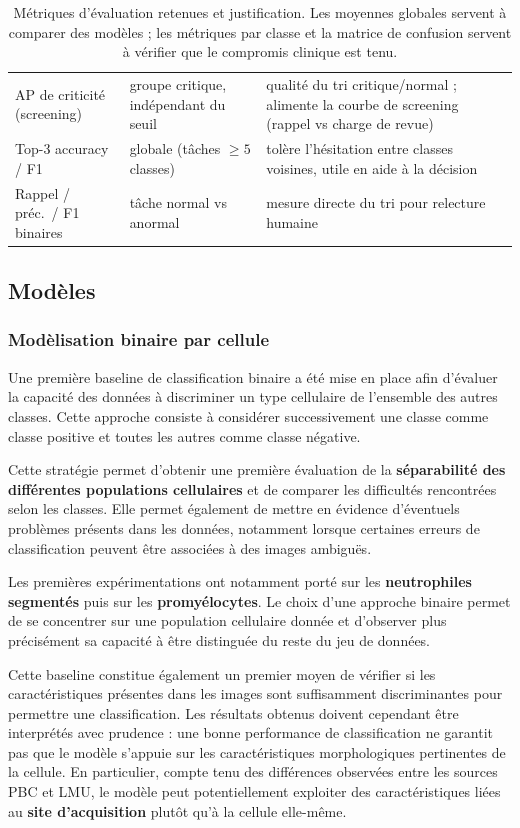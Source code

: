 \begin{table}[H]
\begin{tabular}{@{}>{\raggedright\arraybackslash}p{3.1cm} >{\raggedright\arraybackslash}p{4.0cm} >{\raggedright\arraybackslash}p{6.2cm}@{}}
    AP de criticité (screening) & groupe critique, indépendant du seuil & qualité du tri critique/normal ; alimente la courbe de screening (rappel vs charge de revue) \\
    Top-3 accuracy / F1 & globale (tâches $\geq 5$ classes) & tolère l'hésitation entre classes voisines, utile en aide à la décision \\
    Rappel / préc.\ / F1 binaires & tâche normal vs anormal    & mesure directe du tri pour relecture humaine \\
    \bottomrule
  \end{tabular}
  \caption{Métriques d'évaluation retenues et justification.
  Les moyennes globales servent à comparer des modèles ; les métriques par classe et la matrice de confusion servent à vérifier que le compromis clinique est tenu.}
  \label{tab:metriques}
\end{table}

\subsection{Modèles}
\subsubsection{Modèlisation binaire par cellule}
\label{sec:modele-binaire}
Une première baseline de classification binaire a été mise en place afin d’évaluer la capacité des données à discriminer un type cellulaire de l’ensemble des autres classes.
Cette approche consiste à considérer successivement une classe comme classe positive et toutes les autres comme classe négative.

Cette stratégie permet d’obtenir une première évaluation de la \textbf{séparabilité des différentes populations cellulaires} et de comparer les difficultés rencontrées selon les classes.
Elle permet également de mettre en évidence d’éventuels problèmes présents dans les données, notamment lorsque certaines erreurs de classification peuvent être associées à des images ambiguës.

Les premières expérimentations ont notamment porté sur les \textbf{neutrophiles segmentés} puis sur les \textbf{promyélocytes}.
Le choix d’une approche binaire permet de se concentrer sur une population cellulaire donnée et d’observer plus précisément sa capacité à être distinguée du reste du jeu de données.

Cette baseline constitue également un premier moyen de vérifier si les caractéristiques présentes dans les images sont suffisamment discriminantes pour permettre une classification.
Les résultats obtenus doivent cependant être interprétés avec prudence : une bonne performance de classification ne garantit pas que le modèle s’appuie sur les caractéristiques morphologiques pertinentes de la cellule.
En particulier, compte tenu des différences observées entre les sources PBC et LMU, le modèle peut potentiellement exploiter des caractéristiques liées au \textbf{site d’acquisition} plutôt qu’à la cellule elle-même.

